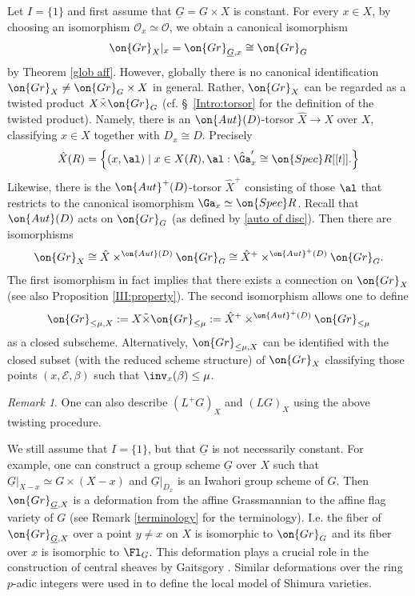 \documentclass[]{pcmi}
\theoremstyle{plain}
\theoremstyle{remark}
\newtheorem{rmk}[equation]{Remark}
\theoremstyle{definition}
\newcommand{\mE}{{\mathcal E}}
\newcommand{\mO}{{\mathcal O}}
\newcommand{\Aut}{{\on{Aut}}}
\newcommand{\Gr}{{\on{Gr}}}
\newcommand{\Spec}{\on{Spec}}
\begin{document}
Let $I=\{1\}$ and first assume that $\underline G=G\times X$ is constant. 
For every $x\in X$, by choosing an isomorphism $\mO_x\simeq \mO$, we obtain a canonical isomorphism
\[\Gr_{X}|_x=\Gr_{\underline G, x}\cong \Gr_{G}\]
by Theorem \ref{glob aff}.
However, globally
there is no canonical identification $\Gr_X\neq \Gr_G\times X$ in general. Rather, $\Gr_X$ can be regarded as a twisted product $X\tilde\times\Gr_G$ (cf. \S~\ref{Intro:torsor} for the definition of the twisted product). Namely, there is an $\Aut(D)$-torsor $\hat{X}\to X$ over $X$, classifying $x\in X$ together with $D_x\cong D$. Precisely
\[\hat{X}(R)=\left\{(x,\al)\mid x\in X(R), \al: \hat{\Ga}'_x\cong \Spec R[[t]].\right\}\]
 Likewise, there is the $\Aut^+(D)$-torsor $\hat{X}^+$ consisting of those $\al$ that restricts to the canonical isomorphism $\Ga_x\simeq \Spec R$. Recall that $\Aut(D)$ acts on $\Gr_G$ (as defined by \eqref{auto of disc}).
Then there are isomorphisms
\begin{equation}\label{III: twisted constr}
\Gr_X\cong \hat{X}\times^{\Aut(D)}\Gr_G\cong \hat{X}^+\times^{\Aut^+(D)}\Gr_G.
\end{equation}
The first isomorphism in fact implies that there exists a connection on $\Gr_X$ (see also Proposition \ref{III:property}).
The second isomorphism  allows one to define
\begin{equation}\label{III:SV over X}
\Gr_{\leq \mu,X}: =X\tilde\times \Gr_{\leq \mu}:=\hat{X}^+\times^{\Aut^+(D)}\Gr_{\leq \mu}
\end{equation}
as a closed subscheme. Alternatively, $\Gr_{\leq \mu,X}$ can be identified with the closed subset (with the reduced scheme structure) of $\Gr_X$ classifying those points $(x,\mE,\beta)$ such that $\inv_x(\beta)\leq \mu$.

\begin{rmk}
One can also describe $(L^+G)_X$ and $(LG)_X$ using the above twisting procedure.
\end{rmk}

We still assume that $I=\{1\}$, but that $\underline G$ is not necessarily constant. For example, one can construct a group scheme $\underline G$ over $X$ such that $\underline G|_{X-x}\simeq G\times (X-x)$ and $\underline G|_{D_x}$ is an Iwahori group scheme of $G$. Then $\Gr_{\underline G, X}$ is a deformation from the affine Grassmannian to the affine flag variety of $G$ (see Remark \ref{terminology} for the terminology). I.e. the fiber of $\Gr_{\underline G, X}$ over a point $y\neq x$ on $X$ is isomorphic to $\Gr_G$ and its fiber over $x$ is isomorphic to $\Fl_G$. This deformation plays a crucial role in the construction of central sheaves by Gaitsgory \cite{Ga}. Similar deformations over the ring $p$-adic integers were used in \cite{PZ} to define the local model of Shimura varieties.
\end{document}
